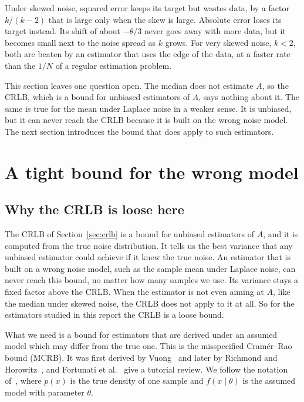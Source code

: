 \documentclass[11pt]{article}
\numberwithin{figure}{section}
\numberwithin{equation}{section}
\begin{document}
Under skewed noise, squared error keeps its target but wastes data, by a factor $k/(k-2)$ that is
large only when the skew is large. Absolute error loses its target instead. Its shift of about
$-\theta/3$ never goes away with more data, but it becomes small next to the noise spread as $k$
grows. For very skewed noise, $k < 2$, both are beaten by an estimator that uses the edge of the
data, at a faster rate than the $1/N$ of a regular estimation problem.

This section leaves one question open. The median does not estimate $A$, so the CRLB, which is a
bound for unbiased estimators of $A$, says nothing about it. The same is true for the mean under
Laplace noise in a weaker sense. It is unbiased, but it can never reach the CRLB because it is built
on the wrong noise model. The next section introduces the bound that does apply to such estimators.

\section{A tight bound for the wrong model}
\label{sec:mcrb}

\subsection{Why the CRLB is loose here}

The CRLB of Section~\ref{sec:crlb} is a bound for unbiased estimators of $A$, and it is computed from
the true noise distribution. It tells us the best variance that any unbiased estimator could
achieve if it knew the true noise. An estimator that is built on a wrong noise model, such as the
sample mean under Laplace noise, can never reach this bound, no matter how many samples we use.
Its variance stays a fixed factor above the CRLB. When the estimator is not even aiming at $A$,
like the median under skewed noise, the CRLB does not apply to it at all. So for the estimators
studied in this report the CRLB is a loose bound.

What we need is a bound for estimators that are derived under an assumed model which may differ
from the true one. This is the misspecified Cram\'er--Rao bound (MCRB). It was first derived by
Vuong~\cite{vuong} and later by Richmond and Horowitz~\cite{richmond}, and Fortunati et
al.~\cite{fortunati} give a tutorial review. We follow the notation of~\cite{fortunati}, where $p(x)$
is the true density of one sample and $f(x \mid \theta)$ is the assumed model with parameter $\theta$.
\end{document}
